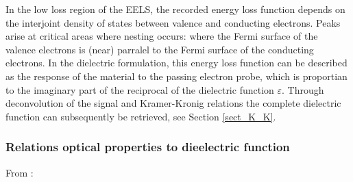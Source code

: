 In the low loss region of the EELS, the recorded energy loss function depends on the interjoint density of states between valence and conducting electrons. Peaks arise at critical areas where nesting occurs: where the Fermi surface of the valence electrons is (near) parralel to the Fermi surface of the conducting electrons. In the dielectric formulation, this energy loss function can be described as the response of the material to the passing electron probe, which is proportian to the imaginary part of the reciprocal of the dielectric function $\varepsilon$. Through deconvolution of the signal and Kramer-Kronig relations the complete dielectric function can subsequently be retrieved, see Section \ref{sect_K_K}.





\subsubsection{Relations optical properties to dieelectric function}
From \cite{brockt_lakner_2000}:

